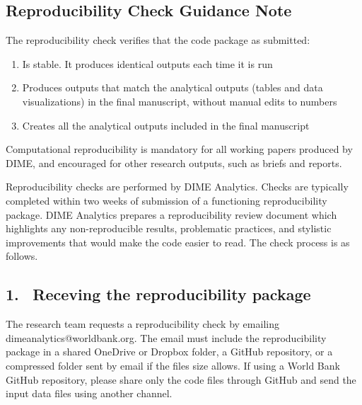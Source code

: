 


	\begin{fullwidth}


	\section*{Reproducibility Check Guidance Note}

The reproducibility check verifies that the code package as submitted:

	\begin{enumerate}
		\setlength\itemsep{-0.1em}
		\item Is stable. It produces identical outputs each time it is run
		\item Produces outputs that match the analytical outputs (tables and data visualizations) in the final manuscript, without manual edits to numbers
		\item Creates all the analytical outputs included in the final manuscript
	\end{enumerate}

Computational reproducibility is mandatory for all working papers produced by DIME, and encouraged for other research outputs, such as briefs and reports. 

	Reproducibility checks are performed by DIME Analytics. Checks are typically completed within two weeks of submission of a functioning reproducibility package. DIME Analytics prepares a reproducibility review document which highlights any non-reproducible results, problematic practices, and stylistic improvements that would make the code easier to read. The check process is as follows.

	\subsection{1. \, Receving the reproducibility package}

	The research team requests a reproducibility check by emailing dimeanalytics@worldbank.org. The email must include the reproducibility package in a shared OneDrive or Dropbox folder, a GitHub repository, or a compressed folder sent by email if the files size allows. If using a World Bank GitHub repository, please share only the code files through GitHub and send the input data files using another channel. 
	

\end{fullwidth}
